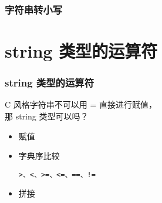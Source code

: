 \begin{frame}[fragile]
    \frametitle{字符串转小写}

    
            
\end{frame}


\section{string 类型的运算符}

\begin{frame}[fragile]
    \frametitle{string 类型的运算符}

     {
        \begin{block}{}
            \vspace{.5cm}
            \begin{center}
                C 风格字符串不可以用 = 直接进行赋值，\\ 那 string 类型可以吗？
            \end{center}
            \vspace{.5cm}
        \end{block}
    }

     {
        \begin{itemize}
            \item 赋值
            
            

            \item 字典序比较
            
            \lstinline|>、<、>=、<=、==、!=| \\
            
            
        
        \end{itemize}
    }

     {
        \begin{itemize}
            \item 拼接
            
            
        
        \end{itemize}
    }
            
\end{frame}

